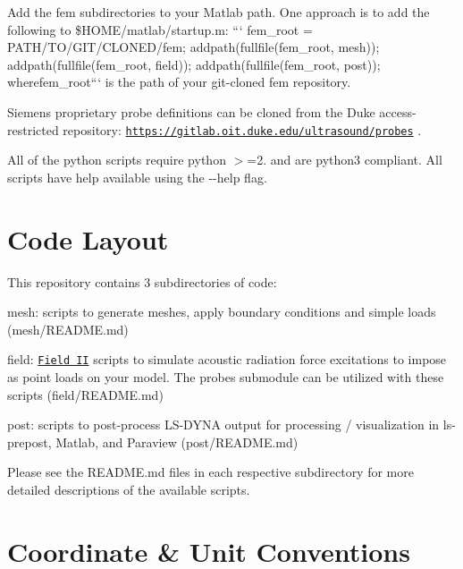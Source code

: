 \begin{DoxyItemize}
\item Add the fem subdirectories to your Matlab path. One approach is to add the following to {\ttfamily \$\+H\+O\+M\+E/matlab/startup.m}\+: ``` fem\+\_\+root = \textquotesingle{}P\+A\+T\+H/\+T\+O/\+G\+I\+T/\+C\+L\+O\+N\+E\+D/fem\textquotesingle{}; addpath(fullfile(fem\+\_\+root, \textquotesingle{}mesh\textquotesingle{})); addpath(fullfile(fem\+\_\+root, \textquotesingle{}field\textquotesingle{})); addpath(fullfile(fem\+\_\+root, \textquotesingle{}post\textquotesingle{})); {\ttfamily  where}fem\+\_\+root``` is the path of your git-\/cloned fem repository.
\item Siemens proprietary probe definitions can be cloned from the Duke access-\/restricted repository\+: \href{https://gitlab.oit.duke.edu/ultrasound/probes}{\tt https\+://gitlab.\+oit.\+duke.\+edu/ultrasound/probes} .
\item All of the python scripts require python $>$=2. and are python3 compliant. All scripts have help available using the {\ttfamily -\/-\/help} flag.
\end{DoxyItemize}

\section*{Code Layout }

This repository contains 3 subdirectories of code\+:


\begin{DoxyEnumerate}
\item {\ttfamily mesh}\+: scripts to generate meshes, apply boundary conditions and simple loads (mesh/\+R\+E\+A\+D\+M\+E.md)
\item {\ttfamily field}\+: \href{http://field-ii.dk}{\tt Field I\+I} scripts to simulate acoustic radiation force excitations to impose as point loads on your model. The {\ttfamily probes} submodule can be utilized with these scripts (field/\+R\+E\+A\+D\+M\+E.md)
\item {\ttfamily post}\+: scripts to post-\/process L\+S-\/\+D\+Y\+N\+A output for processing / visualization in ls-\/prepost, Matlab, and Paraview (post/\+R\+E\+A\+D\+M\+E.md)
\end{DoxyEnumerate}

Please see the {\ttfamily R\+E\+A\+D\+M\+E.\+md} files in each respective subdirectory for more detailed descriptions of the available scripts.

\section*{Coordinate \& Unit Conventions }


